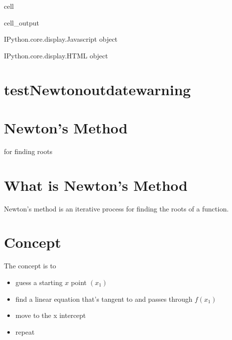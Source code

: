 \documentclass[letterpaper,10pt,english]{jupyterBook}
\begin{document}
\begin{sphinxuseclass}{cell}
\begin{sphinxVerbatimOutput}
\begin{sphinxuseclass}{cell_output}
\begin{sphinxVerbatim}[commandchars=\\\{\}]
\PYGZlt{}IPython.core.display.Javascript object\PYGZgt{}
\end{sphinxVerbatim}

\begin{sphinxVerbatim}[commandchars=\\\{\}]
\PYGZlt{}IPython.core.display.HTML object\PYGZgt{}
\end{sphinxVerbatim}

\end{sphinxuseclass}\end{sphinxVerbatimOutput}

\end{sphinxuseclass}
\sphinxstepscope


\chapter{testNewton\sphinxhyphen{}outdatewarning}
\label{\detokenize{testNewton-outdatewarning:testnewton-outdatewarning}}\label{\detokenize{testNewton-outdatewarning::doc}}

\chapter{Newton’s Method}
\label{\detokenize{testNewton-outdatewarning:newton-s-method}}
\sphinxAtStartPar
for finding roots


\chapter{What is Newton’s Method}
\label{\detokenize{testNewton-outdatewarning:what-is-newton-s-method}}
\sphinxAtStartPar
Newton’s method is an iterative process for finding the roots of a function.


\chapter{Concept}
\label{\detokenize{testNewton-outdatewarning:concept}}
\sphinxAtStartPar
The concept is to
\begin{itemize}
\item {} 
\sphinxAtStartPar
guess a starting \(x\) point \((x_1)\)

\item {} 
\sphinxAtStartPar
find a linear equation that’s tangent to and passes through \(f(x_1)\)

\item {} 
\sphinxAtStartPar
move to the x intercept

\item {} 
\sphinxAtStartPar
repeat

\end{itemize}
\end{document}
